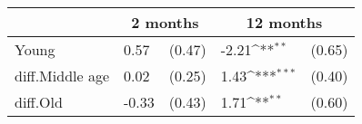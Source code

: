 {
\def\sym#1{\ifmmode^{#1}\else\(^{#1}\)\fi}
\begin{tabular*}{.65\hsize}{@{\hskip\tabcolsep\extracolsep\fill}l*{2}{lc}}
\toprule
                &\multicolumn{2}{c}{2 months}&\multicolumn{2}{c}{12 months}\\
\midrule
Young           &     0.57         &   (0.47)&    -2.21\sym{**} &   (0.65)\\
diff.Middle age &     0.02         &   (0.25)&     1.43\sym{***}&   (0.40)\\
diff.Old        &    -0.33         &   (0.43)&     1.71\sym{**} &   (0.60)\\
\bottomrule
\end{tabular*}
}
